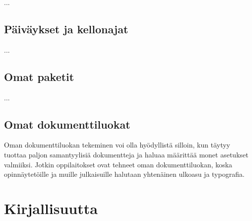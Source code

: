 \documentclass{book}
\begin{document}

...

\section{Päiväykset ja kellonajat}

...

\section{Omat paketit}

...

\section{Omat dokumenttiluokat}
\label{luku:omat_dokumenttiluokat}

Oman dokumenttiluokan tekeminen voi olla hyödyllistä silloin, kun täytyy
tuottaa paljon samantyylisiä dokumentteja ja haluaa määrittää monet
asetukset valmiiksi. Jotkin oppilaitokset ovat tehneet oman
dokumenttiluokan, koska opinnäytetöille ja muille julkaisuille halutaan
yhtenäinen ulkoasu ja typografia.

\backmatter

\chapter{Kirjallisuutta}
\label{luku:kirjallisuutta}

\printbibliography[heading=none]

\end{document}
